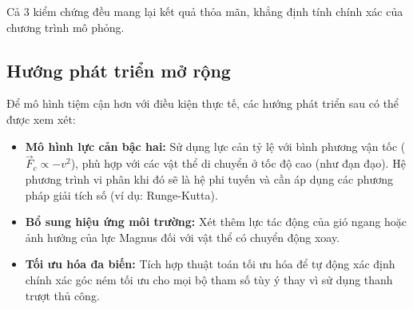 Cả 3 kiểm chứng đều mang lại kết quả thỏa mãn, khẳng định tính chính xác của chương trình mô phỏng.

\subsection{Hướng phát triển mở rộng}
Để mô hình tiệm cận hơn với điều kiện thực tế, các hướng phát triển sau có thể được xem xét:
\begin{itemize}
    \item \textbf{Mô hình lực cản bậc hai:} Sử dụng lực cản tỷ lệ với bình phương vận tốc ($\vec{F}_c \propto -v^2$), phù hợp với các vật thể di chuyển ở tốc độ cao (như đạn đạo). Hệ phương trình vi phân khi đó sẽ là hệ phi tuyến và cần áp dụng các phương pháp giải tích số (ví dụ: Runge-Kutta).
    
    \item \textbf{Bổ sung hiệu ứng môi trường:} Xét thêm lực tác động của gió ngang hoặc ảnh hưởng của lực Magnus đối với vật thể có chuyển động xoay.
    
    \item \textbf{Tối ưu hóa đa biến:} Tích hợp thuật toán tối ưu hóa để tự động xác định chính xác góc ném tối ưu cho mọi bộ tham số tùy ý thay vì sử dụng thanh trượt thủ công.
\end{itemize}
